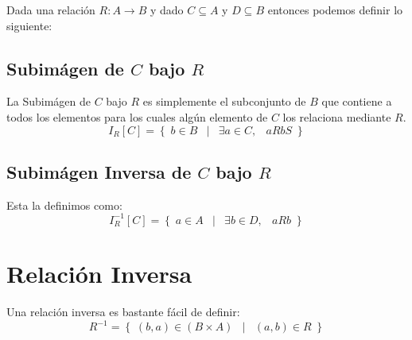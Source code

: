 \documentclass[12pt, fleqn]{report}                             %
\DeclareMathOperator \Space     {\quad}                         %
\DeclareMathOperator \MiniSpace {\;}                            %
\newcommand \Such           {\MiniSpace | \MiniSpace}           %
\theoremstyle{break}                                            %
\newcommand{\Set}[1]            {\left\{ \; #1 \; \right\}}     %
\begin{document}
            Dada una relación $R: A \to B$ y dado $C \subseteq A$ y $D \subseteq B$
            entonces podemos definir lo siguiente:

            \subsection*{Subimágen de $C$ bajo $R$}

                La Subimágen de $C$ bajo $R$ es simplemente el subconjunto de $B$ que contiene
                a todos los elementos para los cuales algún elemento de $C$ los relaciona
                mediante $R$.
                \begin{equation*}
                    I_R[C] = \Set{ b \in B \Such \exists a \in C, \MiniSpace aRb S}
                \end{equation*}


            \subsection*{Subimágen Inversa de $C$ bajo $R$}

                Esta la definimos como:
                \begin{equation*}
                    I_R^{-1}[C] = \Set{ a \in A \Such \exists b \in D, \MiniSpace aRb }
                \end{equation*}




        \clearpage
        \section{Relación Inversa}

            Una relación inversa es bastante fácil de definir:
            \begin{equation*}
                R^{-1} = \Set{ (b, a) \in (B \times A) \Such (a, b) \in R }
            \end{equation*}
\end{document}
